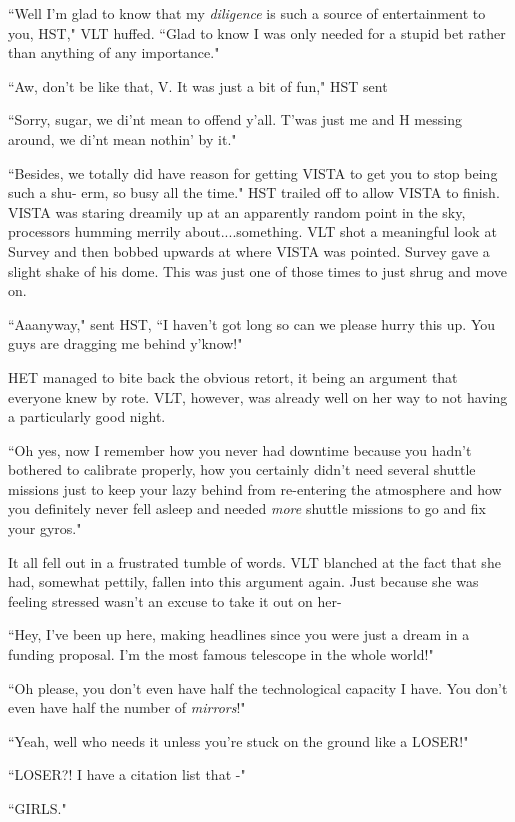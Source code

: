 \documentclass[12pt]{iopart}
\begin{document}
``Well I'm glad to know that my \emph{diligence} is such a source of entertainment to you, HST," VLT huffed. ``Glad to know I was only needed for a stupid bet rather than anything of any importance."

``Aw, don't be like that, V. It was just a bit of fun," HST sent

``Sorry, sugar, we di'nt mean to offend y'all. T'was just me and H messing around, we di'nt mean nothin' by it."

``Besides, we totally did have reason for getting VISTA to get you to stop being such a shu- erm, so busy all the time." HST trailed off to allow VISTA to finish. VISTA was staring dreamily up at an apparently random point in the sky, processors humming merrily about....something. VLT shot a meaningful look at Survey and then bobbed upwards at where VISTA was pointed. Survey gave a slight shake of his dome. This was just one of those times to just shrug and move on.

``Aaanyway," sent HST, ``I haven't got long so can we please hurry this up. You guys are dragging me behind y'know!"

HET managed to bite back the obvious retort, it being an argument that everyone knew by rote. VLT, however, was already well on her way to not having a particularly good night.

``Oh yes, now I remember how you never had downtime because you hadn't bothered to calibrate properly, how you certainly didn't need several shuttle missions just to keep your lazy behind from re-entering the atmosphere and how you definitely never fell asleep and needed \emph{more} shuttle missions to go and fix your gyros."

It all fell out in a frustrated tumble of words. VLT blanched at the fact that she had, somewhat pettily, fallen into this argument again. Just because she was feeling stressed wasn't an excuse to take it out on her-

``Hey, I've been up here, making headlines since you were just a dream in a funding proposal. I'm the most famous telescope in the whole world!"

``Oh please, you don't even have half the technological capacity I have. You don't even have half the number of \emph{mirrors}!"

``Yeah, well who needs it unless you're stuck on the ground like a LOSER!"

``LOSER?! I have a citation list that -"

``GIRLS."
\end{document}
